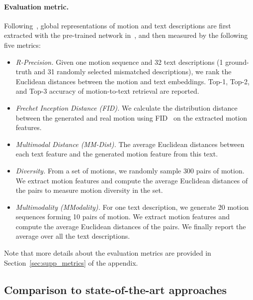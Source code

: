 \documentclass[10pt,twocolumn,letterpaper]{article}
\begin{document}
\paragraph{Evaluation metric.} Following~\cite{guo2022generating}, global representations of motion and text descriptions are first extracted with the pre-trained network in~\cite{guo2022generating}, and then measured by the following five metrics:
\begin{itemize}
  \item \textit{R-Precision.} Given one motion sequence and 32 text descriptions (1 ground-truth and 31 randomly selected mismatched descriptions), we rank the Euclidean distances between the motion and text embeddings. Top-1, Top-2, and Top-3 accuracy of motion-to-text retrieval are reported.
  \item \textit{Frechet Inception Distance (FID).} We calculate the distribution distance between the generated and real motion using FID~\cite{heusel2017gans} on the extracted motion features.
  \item \textit{Multimodal Distance (MM-Dist).} The average Euclidean distances between each text feature and the generated motion feature from this text.
  \item \textit{Diversity.} From a set of motions, we randomly sample 300 pairs of motion. We extract motion features and compute the average Euclidean distances of the pairs to measure motion diversity in the set.
  \item \textit{Multimodality (MModality).} For one text description, we generate 20 motion sequences forming 10 pairs of motion. We extract motion features and compute the average Euclidean distances of the pairs. We finally report the average over all the text descriptions.
\end{itemize}

Note that more details about the evaluation metrics are provided in Section~\ref{sec:supp_metrics} of the appendix.


\subsection{Comparison to state-of-the-art approaches}
\label{sec:compare}
\end{document}
